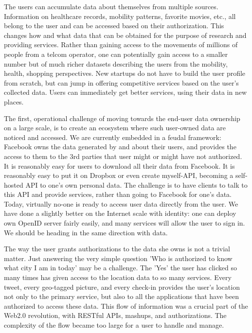 The users can accumulate data about themselves from multiple sources. 
Information on healthcare records, mobility patterns, favorite movies, etc., all belong to the user and can be accessed based on their authorization.
This changes how and what data that can be obtained for the purpose of research and providing services.
Rather than gaining access to the movements of millions of people from a telcom operator, one can potentially gain access to a smaller number but of much richer datasets describing the users from the mobility, health, shopping  perspectives.
New startups do not have to build the user profile from scratch, but can jump in offering competitive services based on the user's collected data.
Users can immediately get better services, using their data in new places.

The first, operational challenge of moving towards the end-user data ownership on a large scale, is to create an ecosystem where such user-owned data are noticed and accessed.
We are currently embedded in a feudal framework: Facebook owns the data generated by and about their users, and provides the access to them to the 3rd parties that user might or might have not authorized. 
It is reasonably easy for users to download all their data from Facebook. 
It is reasonably easy to put it on Dropbox or even create myself-API, becoming a self-hosted API to one's own personal data. 
The challenge is to have clients to talk to this API and provide services, rather than going to Facebook for one's data. 
Today, virtually no-one is ready to access user data directly from the user. 
We have done a slightly better on the Internet scale with identity: one can deploy own OpenID server fairly easily, and many services will allow the user to sign in. We should be heading in the same direction with data.

The way the user grants authorizations to the data she owns is not a trivial matter.
Just answering the very simple question 'Who is authorized to know what city I am in today' may be a challenge.
The 'Yes' the user has clicked so many times has given access to the location data to so many services.
Every tweet, every geo-tagged picture, and every check-in provides the user's location not only to the primary service, but also to all the applications that have been authorized to access these data.
This flow of information was a crucial part of the Web2.0 revolution, with RESTful APIs, mashups, and authorizations.
The complexity of the flow became too large for a user to handle and manage.

